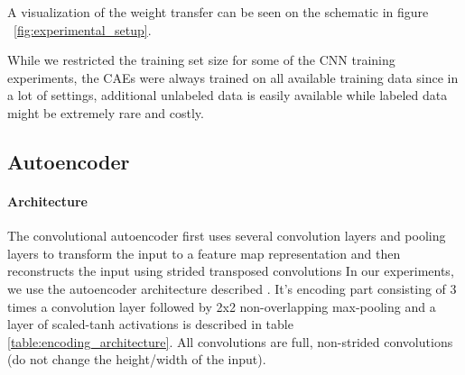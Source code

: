 \documentclass[draft]{article}
\begin{document}
  A visualization of the weight transfer can be seen on the schematic in figure ~\ref{fig:experimental_setup}. 

  While we restricted the training set size for some of the CNN training experiments, the CAEs were always trained on all available training data since in a lot of settings, additional unlabeled data is easily available while labeled data might be extremely rare and costly.  

  \subsection{Autoencoder}

    \paragraph{Architecture}
    The convolutional autoencoder first uses several convolution layers and pooling layers to transform the input to a feature map representation and then reconstructs the input using strided transposed convolutions 
    In our experiments, we use the autoencoder architecture described \citep{masci11}. It's encoding part consisting of 3 times a convolution layer followed by 2x2 non-overlapping max-pooling and a layer of scaled-tanh activations is described in table \ref{table:encoding_architecture}. All convolutions are full, non-strided convolutions (do not change the height/width of the input). 

    \begin{table}[h]

      \centering

        
      \caption{CAE/CNN: shared encoding layers. Channels refers to the amount of feature maps in the given layer}
      \label{table:encoding_architecture}

    \end{table}
\end{document}
